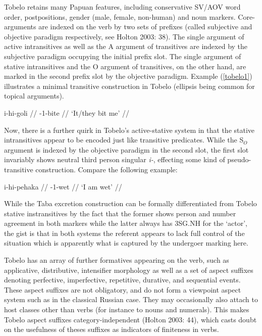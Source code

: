 Tobelo retains many Papuan features, including conservative SV/AOV word order, postpositions, gender (male, female, non-human) and noun markers. Core-arguments are indexed on the verb by two sets of prefixes (called subjective and objective paradigm respectively, see Holton 2003: 38). The single argument of active intransitives as well as the A argument of transitives are indexed by the subjective paradigm occupying the initial prefix slot. The single argument of stative intransitives and the O argument of transitives, on the other hand, are marked in the second prefix slot by the objective paradigm. Example (\ref{tobelo1}) illustrates a minimal transitive construction in Tobelo (ellipsis being common for topical arguments).

\ex \label{tobelo1}
\begingl
\gla i-hi-goli // 
-1-bite //
\glft `It/they bit me' // 
\endgl
\xe

Now, there is a further quirk in Tobelo's active-stative system in that the stative intransitives appear to be encoded just like transitive predicates. While the S$_O$ argument is indexed by the objective paradigm in the second slot, the first slot invariably shows neutral third person singular \textit{i-}, effecting some kind of pseudo-transitive construction. Compare the following example:

\ex \label{}
\begingl
\gla i-hi-pehaka // 
-1-wet //
\glft `I am wet' // 
\endgl
\xe

While the Taba excretion construction can be formally differentiated from Tobelo stative instransitives by the fact that the former shows person and number agreement in both markers while the latter always has 3SG.NH for the `actor', the gist is that in both systems the referent appears to lack full control of the situation which is apparently what is captured by the undergoer marking here.

Tobelo has an array of further formatives appearing on the verb, such as applicative, distributive, intensifier morphology as well as a set of aspect suffixes denoting perfective, imperfective, repetitive, durative, and sequential events. These aspect suffixes are not obligatory, and do not form a viewpoint aspect system such as in the classical Russian case. They may occasionally also attach to host classes other than verbs (for instance to nouns and numerals). This makes Tobelo aspect suffixes category-independent (Holton 2003: 44), which casts doubt on the usefulness of theses suffixes as indicators of finiteness in verbs. 


